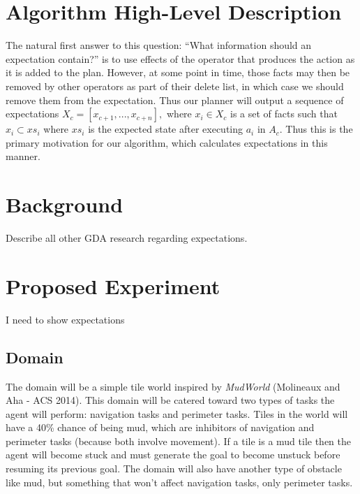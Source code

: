 \documentclass{article}
\begin{document}
\section{Algorithm High-Level Description}
The natural first answer to this question: ``What information should
an expectation contain?'' is to use effects of the operator that
produces the action as it is added to the
plan\footnotemark[4]. However, at some point in time, those facts may
then be removed by other operators as part of their delete list, in
which case we should remove them from the expectation. Thus our
planner will output a sequence of expectations $X_c = [x_{c+1},...,
x_{c+n}],$ where $x_i \in X_c$ is a set of facts such that
$x_i \subset xs_i$ where $xs_i$ is the expected state after executing
$a_i$ in $A_c$. Thus this is the primary motivation for our algorithm,
which calculates expectations in this manner.

\section{Background}
Describe all other GDA research regarding expectations.



\section{Proposed Experiment}
I need to show expectations

\subsection{Domain}
The domain will be a simple tile world inspired by \textit{MudWorld}
(Molineaux and Aha - ACS 2014). This domain will be catered toward two
types of tasks the agent will perform: navigation tasks and perimeter
tasks. Tiles in the world will have a 40\% chance of being mud, which
are inhibitors of navigation and perimeter tasks (because both involve
movement). If a tile is a mud tile then the agent will become stuck
and must generate the goal to become unstuck before resuming its
previous goal. The domain will also have another type of obstacle like
mud, but something that won't affect navigation tasks, only perimeter
tasks.
\end{document}

